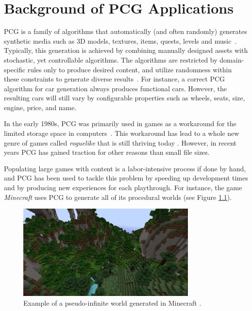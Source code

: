 \chapter{Background of PCG Applications}


PCG is a family of algorithms that automatically (and often randomly) generates synthetic media such as 3D models, textures, items, quests, levels and music~\cite[p.1]{pcg_in_games}.
Typically, this generation is achieved by combining manually designed assets with stochastic, yet controllable algorithms.
The algorithms are restricted by domain-specific rules only to produce desired content, and utilize randomness within these constraints to generate diverse results~\cite{gamasutra}.
For instance, a correct PCG algorithm for car generation always produces functional cars. However, the resulting cars will still vary by configurable properties such as wheels, seats, size, engine, price, and name.

In the early 1980s, PCG was primarily used in games as a workaround for the limited storage space in computers~\cite[p.4]{pcg_in_games}.
This workaround has lead to a whole new genre of games called \textit{roguelike} that is still thriving today \cite{roguelikes}.
However, in recent years PCG has gained traction for other reasons than small file sizes.

Populating large games with content is a labor-intensive process if done by hand, and PCG has been used to tackle this problem by speeding up development times and by producing new experiences for each playthrough.
For instance, the game \textit{Minecraft} \cite{minecraft} uses PCG to generate all of its procedural worlds (see Figure \ref{fig:minecraft}).

\begin{figure}[h!]
  \centering

  \includegraphics[width=0.8\textwidth]{figure/minecraft.jpg}
  \caption{Example of a pseudo-infinite world generated in Minecraft \cite{minecraft_img}.}

  \label{fig:minecraft}
\end{figure}


